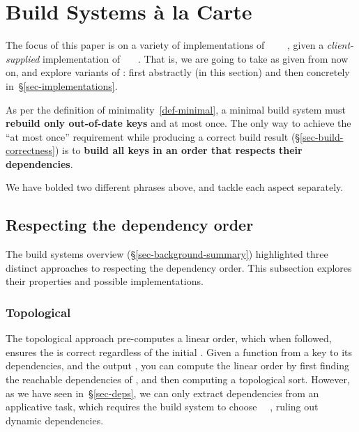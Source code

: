 \section{Build Systems \`a la Carte}\label{sec-build}

The focus of this paper is on a variety of implementations of
~~~~, given
a \emph{client-supplied} implementation of ~~~. That
is, we are going to take  as given from now on, and explore variants of
: first abstractly (in this section) and then concretely
in~\S\ref{sec-implementations}.

As per the definition of minimality~\ref{def-minimal}, a minimal build
system must \textbf{rebuild only out-of-date keys} and at most once. The only
way to achieve the ``at most once'' requirement while producing a correct build
result (\S\ref{sec-build-correctness}) is to \textbf{build all keys in an
order that respects their dependencies}.

\vspace{1mm}
We have bolded two different phrases above, and tackle each aspect separately.

\subsection{Respecting the dependency order}
\label{sec-dependency-orderings}

The build systems overview (\S\ref{sec-background-summary}) highlighted three
distinct approaches to respecting the dependency order. This subsection explores
their properties and possible implementations.

\vspace{-2mm}
\subsubsection{Topological}\label{sec-topological}

The topological approach pre-computes a linear order, which when followed, ensures
the  is correct regardless of the initial . Given a function
from a key to its dependencies, and the output , you can compute the
linear order by first finding the reachable dependencies of ,
and then computing a topological sort. However, as we have seen
in~\S\ref{sec-deps}, we can only extract dependencies from an applicative task,
which requires the build system to choose ~\hs{=}~, ruling
out dynamic dependencies.

